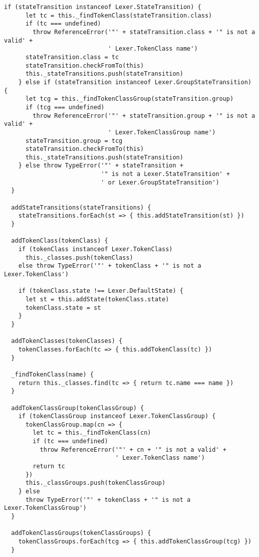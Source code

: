 \begin{lstlisting}[frame=single]
    if (stateTransition instanceof Lexer.StateTransition) {
      let tc = this._findTokenClass(stateTransition.class)
      if (tc === undefined)
        throw ReferenceError('"' + stateTransition.class + '" is not a valid' + 
                             ' Lexer.TokenClass name')
      stateTransition.class = tc
      stateTransition.checkFromTo(this)
      this._stateTransitions.push(stateTransition)
    } else if (stateTransition instanceof Lexer.GroupStateTransition) {
      let tcg = this._findTokenClassGroup(stateTransition.group)
      if (tcg === undefined)
        throw ReferenceError('"' + stateTransition.group + '" is not a valid' + 
                             ' Lexer.TokenClassGroup name')
      stateTransition.group = tcg
      stateTransition.checkFromTo(this)
      this._stateTransitions.push(stateTransition)
    } else throw TypeError('"' + stateTransition + 
                           '" is not a Lexer.StateTransition' + 
                           ' or Lexer.GroupStateTransition')
  }
  
  addStateTransitions(stateTransitions) {
    stateTransitions.forEach(st => { this.addStateTransition(st) })
  }
  
  addTokenClass(tokenClass) {
    if (tokenClass instanceof Lexer.TokenClass)
      this._classes.push(tokenClass)
    else throw TypeError('"' + tokenClass + '" is not a Lexer.TokenClass')
    
    if (tokenClass.state !== Lexer.DefaultState) {
      let st = this.addState(tokenClass.state)
      tokenClass.state = st
    }
  }
  
  addTokenClasses(tokenClasses) {
    tokenClasses.forEach(tc => { this.addTokenClass(tc) })
  }
  
  _findTokenClass(name) {
    return this._classes.find(tc => { return tc.name === name })
  }
  
  addTokenClassGroup(tokenClassGroup) {
    if (tokenClassGroup instanceof Lexer.TokenClassGroup) {
      tokenClassGroup.map(cn => {
        let tc = this._findTokenClass(cn)
        if (tc === undefined)
          throw ReferenceError('"' + cn + '" is not a valid' + 
                               ' Lexer.TokenClass name')
        return tc
      })
      this._classGroups.push(tokenClassGroup)
    } else 
      throw TypeError('"' + tokenClass + '" is not a Lexer.TokenClassGroup')
  }
  
  addTokenClassGroups(tokenClassGroups) {
    tokenClassGroups.forEach(tcg => { this.addTokenClassGroup(tcg) })
  }
  

\end{lstlisting}
